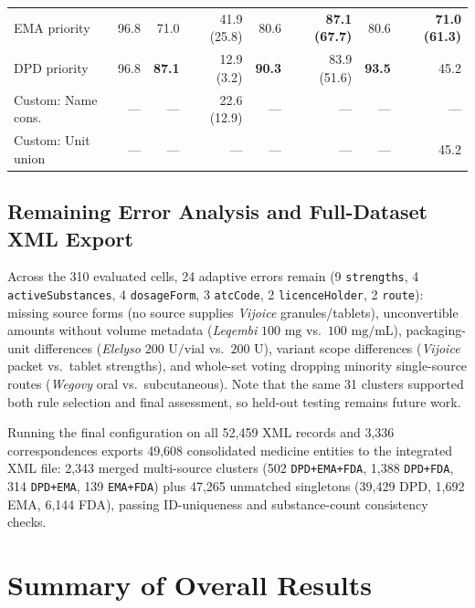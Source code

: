 \documentclass{llncs}
\begin{document}
\begin{table}[htbp]
\begin{tabularx}{\textwidth}{|>{\raggedright\arraybackslash}X|r|r|r|r|r|r|r|}
EMA priority           &  96.8 & 71.0 & 41.9 (25.8) & 80.6 & \textbf{87.1 (67.7)} & 80.6 & \textbf{71.0 (61.3)} \\
DPD priority           &  96.8 & \textbf{87.1} & 12.9 (3.2)  & \textbf{90.3} & 83.9 (51.6) & \textbf{93.5} & 45.2 \\
\hline
Custom: Name cons.     & ---   & ---  & 22.6 (12.9) & ---  & ---         & ---  & --- \\
Custom: Unit union     & ---   & ---  & ---         & ---  & ---         & ---  & 45.2 \\
\hline
\end{tabularx}
\end{table}

\subsection{Remaining Error Analysis and Full-Dataset XML Export}
Across the 310 evaluated cells, 24 adaptive errors remain (9 \texttt{strengths}, 4 \texttt{activeSubstances}, 4 \texttt{dosageForm}, 3 \texttt{atcCode}, 2 \texttt{licenceHolder}, 2 \texttt{route}): missing source forms (no source supplies \textit{Vijoice} granules/tablets), unconvertible amounts without volume metadata (\textit{Leqembi} $100\text{ mg}$ vs.\ $100\text{ mg/mL}$), packaging-unit differences (\textit{Elelyso} $200\text{ U/vial}$ vs.\ $200\text{ U}$), variant scope differences (\textit{Vijoice} packet vs.\ tablet strengths), and whole-set voting dropping minority single-source routes (\textit{Wegovy} oral vs.\ subcutaneous). Note that the same 31 clusters supported both rule selection and final assessment, so held-out testing remains future work.

Running the final configuration on all 52,459 XML records and 3,336 correspondences exports 49,608 consolidated medicine entities to the integrated XML file: 2,343 merged multi-source clusters (502 \texttt{DPD+EMA+FDA}, 1,388 \texttt{DPD+FDA}, 314 \texttt{DPD+EMA}, 139 \texttt{EMA+FDA}) plus 47,265 unmatched singletons (39,429 DPD, 1,692 EMA, 6,144 FDA), passing ID-uniqueness and substance-count consistency checks.

\section{Summary of Overall Results}
\label{sec:conclusion}
\end{document}
